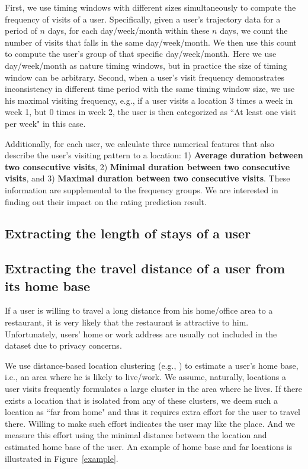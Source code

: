 First, we use timing windows with different sizes simultaneously to compute the frequency of visits of a user. Specifically, given a user's trajectory data for a period of $n$ days, for each day/week/month within these $n$ days, we count the number of visits that falls in the same day/week/month. We then use this count to compute the user's group of that specific day/week/month. Here we use day/week/month as nature timing windows, but in practice the size of timing window can be arbitrary. Second, when a user's visit frequency demonstrates inconsistency in different time period with the same timing window size, we use his maximal visiting frequency, e.g., if a user visits a location 3 times a week in week 1, but 0 times in week 2, the user is then categorized as ``At least one visit per week" in this case.

Additionally, for each user, we calculate three numerical features that also describe the user's visiting pattern to a location: 1) \textbf{Average duration between two consecutive visits}, 2) \textbf{Minimal duration between two consecutive visits}, and 3) \textbf{Maximal duration between two consecutive visits}. These information are supplemental to the frequency groups. We are interested in finding out their impact on the rating prediction result.

\subsection{Extracting the length of stays of a user}




\subsection{Extracting the travel distance of a user from its home base}

If a user is willing to travel a long distance from his home/office area to a restaurant, it is very likely that the restaurant is attractive to him. Unfortunately, users' home or work address are usually not included in the dataset due to privacy concerns. 

We use distance-based location clustering (e.g., \cite{} ) to estimate a user's home base, i.e., an area where he is likely to live/work. We assume, naturally, locations a user visits frequently formulates a large cluster in the area where he lives. If there exists a location that is isolated from any of these clusters, we deem such a location as ``far from home" and thus it requires extra effort for the user to travel there. Willing to make such effort indicates the user may like the place. And we measure this effort using the minimal distance between the location and estimated home base of the user. An example of home base and far locations is illustrated in Figure~\ref{example}.

